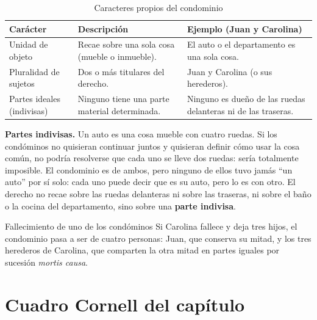 \documentclass[12pt,oneside]{book}
\begin{document}
\begin{table}[H]
\centering
\begin{tabularx}{\textwidth}{
    >{\raggedright\arraybackslash}p{}
    >{\raggedright\arraybackslash}X
    >{\raggedright\arraybackslash}X
}
\toprule
\textbf{Carácter} & \textbf{Descripción} & \textbf{Ejemplo (Juan y Carolina)} \\
\midrule
Unidad de objeto & Recae sobre una sola cosa (mueble o inmueble). & El auto o el departamento es una sola cosa. \\
Pluralidad de sujetos & Dos o más titulares del derecho. & Juan y Carolina (o sus herederos). \\
Partes ideales (indivisas) & Ninguno tiene una parte material determinada. & Ninguno es dueño de las ruedas delanteras ni de las traseras. \\
\bottomrule
\end{tabularx}
\caption{Caracteres propios del condominio}
\end{table}

\textbf{Partes indivisas.} Un auto es una cosa mueble con cuatro ruedas. Si los condóminos no quisieran continuar juntos y quisieran definir cómo usar la cosa común, no podría resolverse que cada uno se lleve dos ruedas: sería totalmente imposible. El condominio es de ambos, pero ninguno de ellos tuvo jamás ``un auto'' por sí solo: cada uno puede decir que es su auto, pero lo es con otro. El derecho no recae sobre las ruedas delanteras ni sobre las traseras, ni sobre el baño o la cocina del departamento, sino sobre una \textbf{parte indivisa}.

\begin{example}{Fallecimiento de uno de los condóminos}
Si Carolina fallece y deja tres hijos, el condominio pasa a ser de cuatro personas: Juan, que conserva su mitad, y los tres herederos de Carolina, que comparten la otra mitad en partes iguales por sucesión \textit{mortis causa}.
\end{example}

\section{Cuadro Cornell del capítulo}
\end{document}
